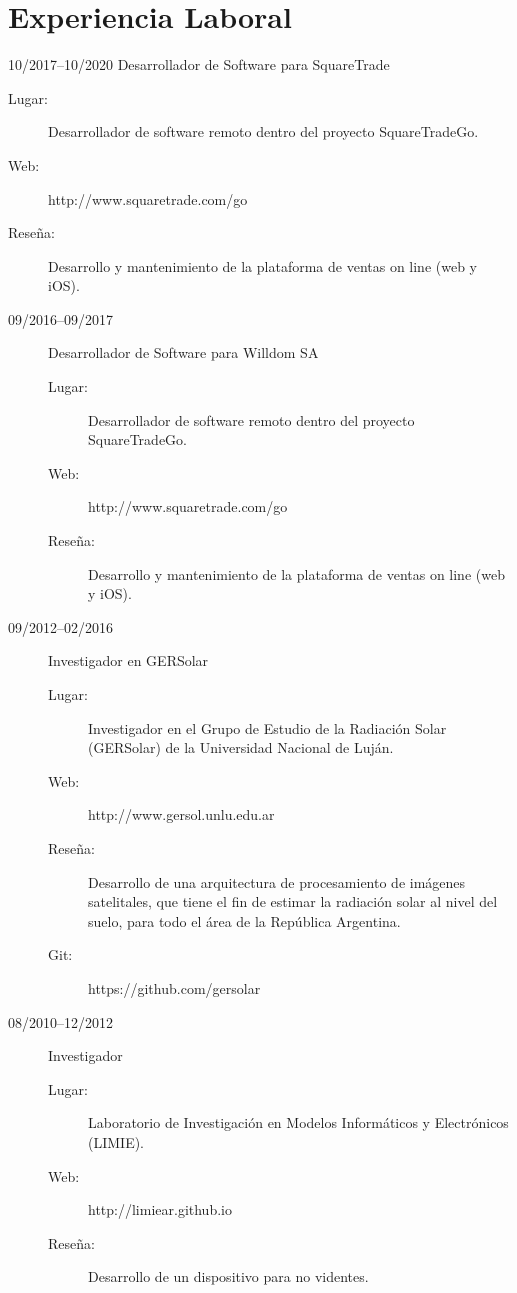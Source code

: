 \documentclass[a4paper]{article}
\begin{document}
\section{Experiencia Laboral}
\item[10/2017--10/2020] Desarrollador de Software para SquareTrade
	\begin{description}
	\item[Lugar: ] Desarrollador de software remoto dentro del proyecto SquareTradeGo.
	\item[Web: ] http://www.squaretrade.com/go
	\item[Rese\~na: ]  Desarrollo y mantenimiento de la plataforma de ventas on line (web y iOS).
	\end{description}
\begin{description}
\item[09/2016--09/2017] Desarrollador de Software para Willdom SA
	\begin{description}
	\item[Lugar: ] Desarrollador de software remoto dentro del proyecto SquareTradeGo.
	\item[Web: ] http://www.squaretrade.com/go
	\item[Rese\~na: ]  Desarrollo y mantenimiento de la plataforma de ventas on line (web y iOS).
	\end{description}
\item[09/2012--02/2016] Investigador en GERSolar
	\begin{description}
	\item[Lugar: ] Investigador en el Grupo de Estudio de la Radiaci{\'o}n Solar (GERSolar) de la Universidad Nacional de Luj{\'a}n.
	\item[Web: ] http://www.gersol.unlu.edu.ar
	\item[Rese\~na: ]  Desarrollo de una arquitectura de procesamiento de im{\'a}genes satelitales, que tiene el fin  de estimar la radiaci{\'o}n solar al nivel del suelo, para todo el {\'a}rea de la Rep{\'u}blica Argentina.
	\item[Git: ] https://github.com/gersolar
	\end{description}
\item[08/2010--12/2012] Investigador
	\begin{description}
	\item[Lugar: ] Laboratorio de Investigaci{\'o}n en Modelos Inform{\'a}ticos y Electr{\'o}nicos (LIMIE).
	\item[Web: ] http://limiear.github.io
	\item[Rese\~na: ] Desarrollo de un dispositivo para no videntes.

\end{description}
\end{description}
\end{document}
